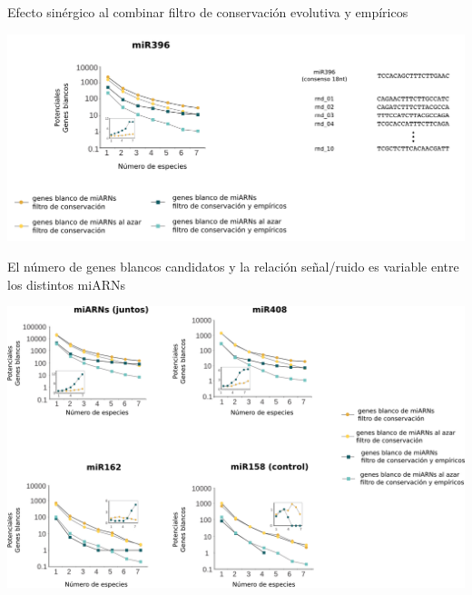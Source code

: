 \documentclass{beamer}
\begin{document}
\begin{frame}{Efecto sinérgico al combinar filtro de conservación evolutiva y empíricos}
	\begin{center}
		\includegraphics[width=1\textwidth]{img/NAR_fig2_05.png}
	\end{center}
\end{frame}

\begin{frame}{El número de genes blancos candidatos y la relación señal/ruido es variable entre los distintos miARNs}
	\begin{center}
		\includegraphics[width=1\textwidth]{img/NAR_fig2_bis.png}
	\end{center}
\end{frame}
\end{document}
